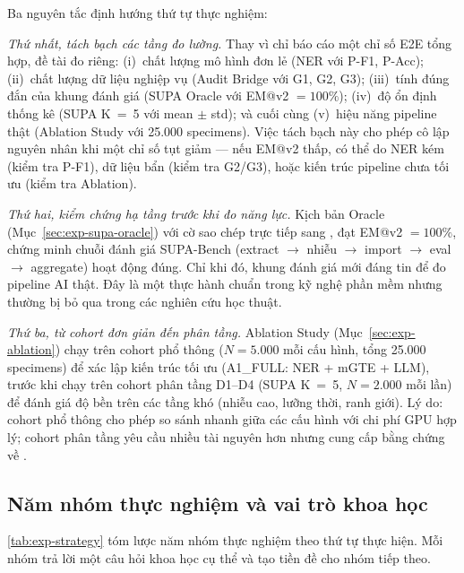 Ba nguyên tắc định hướng thứ tự thực nghiệm:

\emph{Thứ nhất, tách bạch các tầng đo lường.} Thay vì chỉ báo cáo một chỉ số E2E tổng hợp, đề tài đo riêng: (i)~chất lượng mô hình đơn lẻ (NER với P-F1, P-Acc); (ii)~chất lượng dữ liệu nghiệp vụ (Audit Bridge với G1, G2, G3); (iii)~tính đúng đắn của khung đánh giá (SUPA Oracle với EM@v2 \(= 100\%\)); (iv)~độ ổn định thống kê (SUPA K~=~5 với mean \(\pm\) std); và cuối cùng (v)~hiệu năng pipeline thật (Ablation Study với 25.000 specimens). Việc tách bạch này cho phép cô lập nguyên nhân khi một chỉ số tụt giảm --- nếu EM@v2 thấp, có thể do NER kém (kiểm tra P-F1), dữ liệu bẩn (kiểm tra G2/G3), hoặc kiến trúc pipeline chưa tối ưu (kiểm tra Ablation).

\emph{Thứ hai, kiểm chứng hạ tầng trước khi đo năng lực.} Kịch bản Oracle (Mục~\ref{sec:exp-supa-oracle}) với cờ  sao chép trực tiếp  sang , đạt EM@v2 \(= 100\%\), chứng minh chuỗi đánh giá SUPA-Bench (extract \(\to\) nhiễu \(\to\) import \(\to\) eval \(\to\) aggregate) hoạt động đúng. Chỉ khi đó, khung đánh giá mới đáng tin để đo pipeline AI thật. Đây là một thực hành  chuẩn trong kỹ nghệ phần mềm nhưng thường bị bỏ qua trong các nghiên cứu học thuật.

\emph{Thứ ba, từ cohort đơn giản đến phân tầng.} Ablation Study (Mục~\ref{sec:exp-ablation}) chạy trên cohort phổ thông (\(N = 5.000\) mỗi cấu hình, tổng 25.000 specimens) để xác lập kiến trúc tối ưu (A1\_FULL: NER + mGTE + LLM), trước khi chạy trên cohort phân tầng D1--D4 (SUPA K~=~5, \(N = 2.000\) mỗi lần) để đánh giá độ bền trên các tầng khó (nhiễu cao, lưỡng thời, ranh giới). Lý do: cohort phổ thông cho phép so sánh nhanh giữa các cấu hình với chi phí GPU hợp lý; cohort phân tầng yêu cầu nhiều tài nguyên hơn nhưng cung cấp bằng chứng về .

\subsection{Năm nhóm thực nghiệm và vai trò khoa học}
\label{sec:exp-strategy-groups}

\cref{tab:exp-strategy} tóm lược năm nhóm thực nghiệm theo thứ tự thực hiện. Mỗi nhóm trả lời một câu hỏi khoa học cụ thể và tạo tiền đề cho nhóm tiếp theo.

